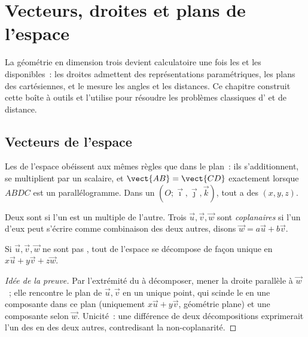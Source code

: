 \chapter{Vecteurs, droites et plans de l'espace}\label{ch:g12:space}

La géométrie en dimension trois devient calculatoire une fois les 
et les  disponibles~: les droites admettent des représentations
paramétriques, les plans des  cartésiennes, et le 
mesure les angles et les distances. Ce chapitre construit cette boîte à
outils et l'utilise pour résoudre les problèmes classiques d'
et de distance.

\section{Vecteurs de l'espace}

Les  de l'espace obéissent aux mêmes règles que dans le plan~: ils
s'additionnent, se multiplient par un scalaire, et $\vect{AB} = \vect{CD}$
exactement lorsque $ABDC$ est un parallélogramme. Dans un 
$(O; \vec\imath, \vec\jmath, \vec k)$, tout  a des 
$(x, y, z)$.

\begin{definition}\label{def:g12:space:collinear}
Deux  sont \emph{} si l'un est un multiple de l'autre.
Trois  $\vec u, \vec v, \vec w$ sont \emph{coplanaires}
si l'un d'eux peut s'écrire comme combinaison des deux autres, disons
$\vec w = a\vec u + b\vec v$.
\end{definition}

\begin{proposition}\label{prop:g12:space:basis}
Si $\vec u, \vec v, \vec w$ ne sont pas , tout  de
l'espace se décompose de façon unique en $x\vec u + y\vec v + z\vec w$.
\end{proposition}

\begin{proof}[Idée de la preuve]
Par l'extrémité du  à décomposer, mener la droite parallèle à
$\vec w$~; elle rencontre le plan de $\vec u, \vec v$ en un unique point,
qui scinde le  en une composante dans ce plan (uniquement
$x\vec u + y\vec v$, géométrie plane) et une composante selon $\vec w$.
Unicité~: une différence de deux décompositions exprimerait l'un des
 en  des deux autres, contredisant la non-coplanarité.
\end{proof}

